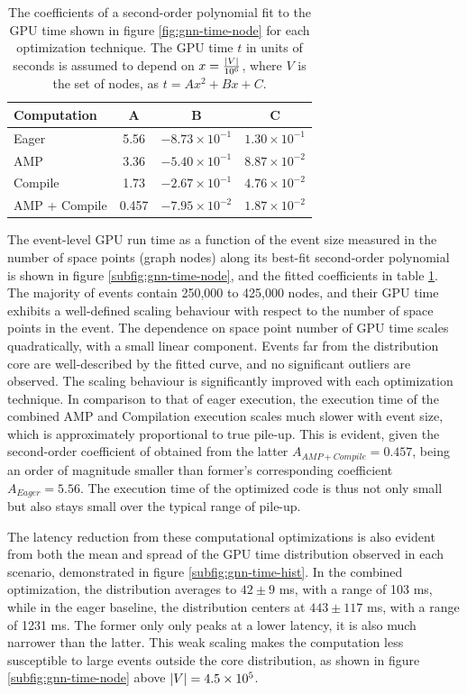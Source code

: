 \begin{table}[ht]
    \centering
    \begin{tabular}{|l|c|c|c|} \hline
      {Computation}   &  {A} & {B} & {C} \\ \hline 
      \hline
       Eager  & 5.56 & $-8.73\times 10^{-1}$ & $1.30\times 10^{-1}$ \\
       AMP & 3.36 & $-5.40\times 10^{-1}$ & $8.87\times10^{-2}$ \\
       Compile & 1.73 & $-2.67\times 10^{-1}$  & $4.76\times 10^{-2}$ \\
       AMP + Compile & 0.457 & $-7.95\times 10^{-2}$ & $1.87\times 10^{-2}$ \\ \hline
    \end{tabular}
    \caption{The coefficients of a second-order polynomial fit to the GPU time shown in figure \ref{fig:gnn-time-node} for each optimization technique. The GPU time $t$ in units of seconds is assumed to depend on $x=\frac{\abs{V}}{10^6}$, where $V$ is the set of nodes, as $t=Ax^2+Bx+C$.}
    \label{tab:gnn-time-node-fit}
\end{table}
The event-level GPU run time as a function of the event size measured in the number of space points (graph nodes) along its best-fit second-order polynomial is shown in figure \ref{subfig:gnn-time-node}, and the fitted coefficients in table \ref{tab:gnn-time-node-fit}.
The majority of events contain 250,000 to 425,000 nodes, and their GPU time exhibits a well-defined scaling behaviour with respect to the number of space points in the event.
The dependence on space point number of GPU time scales quadratically, with a small linear component. 
Events far from the distribution core are well-described by the fitted curve, and no significant outliers are observed. 
The scaling behaviour is significantly improved with each optimization technique. 
In comparison to that of eager execution, the execution time of the combined AMP and Compilation execution scales much slower with event size, which is approximately proportional to true pile-up. 
This is evident, given the second-order coefficient of obtained from the latter $A_{AMP+Compile}=0.457$, being an order of magnitude smaller than former's corresponding coefficient $A_{Eager}=5.56$.
The execution time of the optimized code is thus not only small but also stays small over the typical range of pile-up.

The latency reduction from these computational optimizations is also evident from both the mean and spread of the GPU time distribution observed in each scenario, demonstrated in figure \ref{subfig:gnn-time-hist}.
In the combined optimization, the distribution averages to $42\pm 9$ ms, with a range of 103 ms, while in the eager baseline, the distribution centers at $443\pm117$ ms, with a range of 1231 ms. 
The former only only peaks at a lower latency, it is also much narrower than the latter.
This weak scaling makes the computation less susceptible to large events outside the core distribution, as shown in figure \ref{subfig:gnn-time-node} above $\abs{V}=4.5\times 10^5$.

